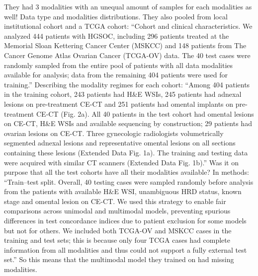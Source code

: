 \documentclass{article}%
\begin{document}
%
They had 3 modalities with an unequal amount of samples for each modalities as well! %
\newline%
\newline%
%
 Data type and modalities distributions.%
\newline%
\newline%
%
They also pooled from local institutional cohort and a TCGA cohort: “Cohort and clinical characteristics. We analyzed 444 patients with HGSOC, including 296 patients treated at the Memorial Sloan Kettering Cancer Center (MSKCC) and 148 patients from The Cancer Genome Atlas Ovarian Cancer (TCGA{-}OV) data. The 40 test cases were randomly sampled from the entire pool of patients with all data modalities available for analysis; data from the remaining 404 patients were used for training.”%
\newline%
\newline%
%
Describing the modality regimes for each cohort: “Among 404 patients in the training cohort, 243 patients had H\&E WSIs, 245 patients had adnexal lesions on pre{-}treatment CE{-}CT and 251 patients had omental implants on pre{-}treatment CE{-}CT (Fig. 2a). All 40 patients in the test cohort had omental lesions on CE{-}CT, H\&E WSIs and available sequencing by construction; 29 patients had ovarian lesions on CE{-}CT. Three gynecologic radiologists volumetrically segmented adnexal lesions and representative omental lesions on all sections containing these lesions (Extended Data Fig. 1a). The training and testing data were acquired with similar CT scanners (Extended Data Fig. 1b).” %
\newline%
\newline%
%
Was it on purpose that all the test cohorts have all their modalities available? %
\newline%
\newline%
%
In methods: “Train–test split. Overall, 40 testing cases were sampled randomly before analysis from the patients with available H\&E WSI, unambiguous HRD status, known stage and omental lesion on CE{-}CT. We used this strategy to enable fair comparisons across unimodal and multimodal models, preventing spurious differences in test concordance indices due to patient exclusion for some models but not for others. We included both TCGA{-}OV and MSKCC cases in the training and test sets; this is because only four TCGA cases had complete information from all modalities and thus could not support a fully external test set.” So this means that the multimodal model they trained on had missing modalities. %
\end{document}
